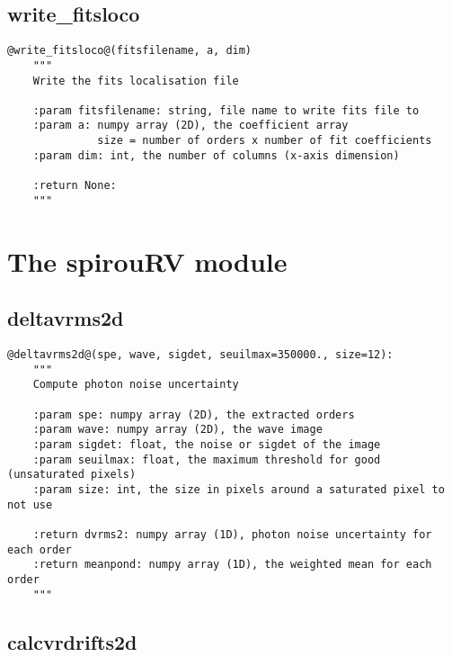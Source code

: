 \vspace{0.5cm}
\subsection{write\_fitsloco}
\begin{lstlisting}[style=pythonstyle]
@write_fitsloco@(fitsfilename, a, dim)
    """
    Write the fits localisation file
    
    :param fitsfilename: string, file name to write fits file to 
    :param a: numpy array (2D), the coefficient array
              size = number of orders x number of fit coefficients
    :param dim: int, the number of columns (x-axis dimension) 
    
    :return None: 
    """
\end{lstlisting}


\clearpage
\newpage
\section{The spirouRV module}

\subsection{deltavrms2d}
\begin{lstlisting}[style=pythonstyle]
@deltavrms2d@(spe, wave, sigdet, seuilmax=350000., size=12):
    """
    Compute photon noise uncertainty
    
    :param spe: numpy array (2D), the extracted orders
    :param wave: numpy array (2D), the wave image
    :param sigdet: float, the noise or sigdet of the image
    :param seuilmax: float, the maximum threshold for good (unsaturated pixels)
    :param size: int, the size in pixels around a saturated pixel to not use
    
    :return dvrms2: numpy array (1D), photon noise uncertainty for each order
    :return meanpond: numpy array (1D), the weighted mean for each order
    """
\end{lstlisting}

\vspace{0.5cm}
\subsection{calcvrdrifts2d}

